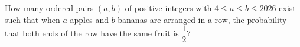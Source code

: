 How many ordered pairs $(a,b)$ of positive integers with $4\leq a\leq b\leq 2026$ exist such that when $a$ apples and $b$ bananas are arranged in a row, the probability that both ends of the row have the same fruit is $\dfrac{1}{2}$?
